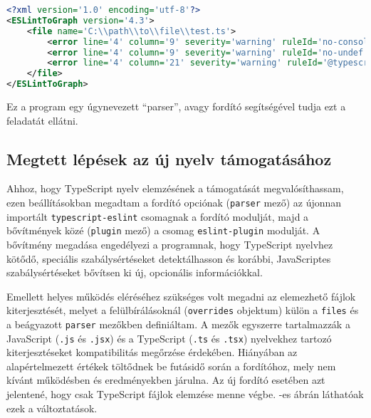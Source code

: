 \begin{lstlisting}[caption={ESLintRunner eredmény fájl példa},label={lst:eslintoutput}, language={xml},basicstyle=\fontsize{9}{11}\selectfont\ttfamily]
<?xml version='1.0' encoding='utf-8'?>
<ESLintToGraph version='4.3'>
    <file name='C:\\path\\to\\file\\test.ts'>
        <error line='4' column='9' severity='warning' ruleId='no-console' nodeType='MemberExpression' message='Unexpected console statement.' />
        <error line='4' column='9' severity='warning' ruleId='no-undef' nodeType='Identifier' message=' &apos; console &apos;  is not defined.' />
        <error line='4' column='21' severity='warning' ruleId='@typescript-eslint/restrict-plus-operands' nodeType='BinaryExpression' message='Operands of  &apos; + &apos;  operation must either be both strings or both numbers. Consider using a template literal.' />
    </file>
</ESLintToGraph>
\end{lstlisting}

Ez a program egy úgynevezett ``parser'', avagy fordító segítségével tudja ezt a feladatát ellátni.

\subsection{Megtett lépések az új nyelv támogatásához}

Ahhoz, hogy TypeScript nyelv elemzésének a támogatását megvalósíthassam, ezen beállításokban megadtam a fordító opciónak (\texttt{parser} mező) az újonnan importált \texttt{typescript-eslint} \cite{typescript-eslint} csomagnak a fordító modulját, majd a bővítmények közé (\texttt{plugin} mező) a csomag \texttt{eslint-plugin} modulját. 
A bővítmény megadása engedélyezi a programnak, hogy TypeScript nyelvhez kötődő, speciális szabálysértéseket detektálhasson és korábbi, JavaScriptes szabálysértéseket bővítsen ki új, opcionális információkkal. 

Emellett helyes működés eléréséhez szükséges volt megadni az elemezhető fájlok kiterjesztését, melyet a felülbírálásoknál (\texttt{overrides} objektum) külön a \texttt{files} és a beágyazott \texttt{parser} mezőkben definiáltam. A mezők egyszerre tartalmazzák a JavaScript (\texttt{.js} és \texttt{.jsx}) és a TypeScript (\texttt{.ts} és \texttt{.tsx}) nyelvekhez tartozó kiterjesztéseket kompatibilitás megőrzése érdekében. Hiányában az alapértelmezett értékek töltődnek be futásidő során a fordítóhoz, mely nem kívánt működésben és eredményekben járulna. Az új fordító esetében azt jelentené, hogy csak TypeScript fájlok elemzése menne végbe. -es ábrán láthatóak ezek a változtatások.


